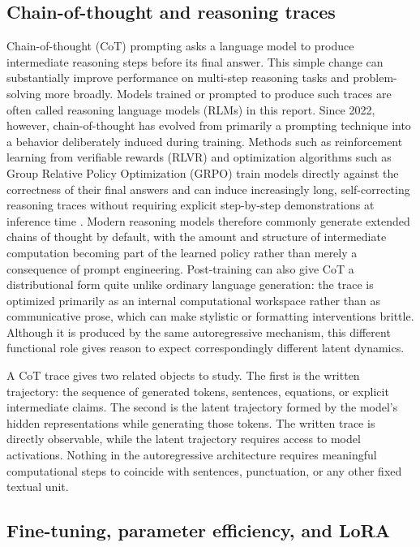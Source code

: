 \subsection{Chain-of-thought and reasoning traces}


Chain-of-thought (CoT) prompting asks a language model to produce intermediate reasoning steps before its final answer. This simple change can substantially improve performance on multi-step reasoning tasks \parencite{wei2022chain} and problem-solving more broadly. Models trained or prompted to produce such traces are often called reasoning language models (RLMs) in this report. Since 2022, however, chain-of-thought has evolved from primarily a prompting technique into a behavior deliberately induced during training. Methods such as reinforcement learning from verifiable rewards (RLVR) and optimization algorithms such as Group Relative Policy Optimization (GRPO) train models directly against the correctness of their final answers and can induce increasingly long, self-correcting reasoning traces without requiring explicit step-by-step demonstrations at inference time \parencite{deepseekai2025r1,shao2024deepseekmath}. Modern reasoning models therefore commonly generate extended chains of thought by default, with the amount and structure of intermediate computation becoming part of the learned policy rather than merely a consequence of prompt engineering. Post-training can also give CoT a distributional form quite unlike ordinary language generation: the trace is optimized primarily as an internal computational workspace rather than as communicative prose, which can make stylistic or formatting interventions brittle. Although it is produced by the same autoregressive mechanism, this different functional role gives reason to expect correspondingly different latent dynamics.

A CoT trace gives two related objects to study. The first is the written trajectory: the sequence of generated tokens, sentences, equations, or explicit intermediate claims. The second is the latent trajectory formed by the model's hidden representations while generating those tokens. The written trace is directly observable, while the latent trajectory requires access to model activations. Nothing in the autoregressive architecture requires meaningful computational steps to coincide with sentences, punctuation, or any other fixed textual unit.

\subsection{Fine-tuning, parameter efficiency, and LoRA}

